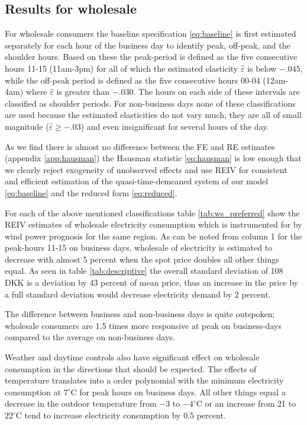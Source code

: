 \label{sec:results}
\subsection{Results for wholesale}
\label{subsec:r_wholesale}
For wholesale consumers the baseline specification \eqref{eq:baseline} is first estimated separately for each hour of the business day to identify peak, off-peak, and the shoulder hours. Based on these the peak-period is defined as the five consecutive hours 11-15 (11am-3pm) for all of which the estimated elasticity $\widehat{\varepsilon}$ is below $-.045$, while the off-peak period is defined as the five consecutive hours 00-04 (12am-4am) where $\widehat{\varepsilon}$ is greater than $-.030$. The hours on each side of these intervals are classified as shoulder periods. For non-business days none of these classifications are used because the estimated elasticities do not vary much, they are all of small magnitude ($\widehat{\varepsilon}\geq-.03$)  and even insignificant for several hours of the day.
\bigskip\par
As we find there is almost no difference between the FE and RE estimates (appendix \ref{app:hausman}) the Hausman statistic \eqref{eq:hausman} is low enough that we clearly reject exogeneity of unobserved effects and use REIV for consistent and efficient estimation of the quasi-time-demeaned system of our model \eqref{eq:baseline} and the reduced form \eqref{eq:reduced}.
\bigskip\par
For each of the above mentioned classifications table \ref{tab:ws_preferred} show the REIV estimates of wholesale electricity consumption which is instrumented for by wind power prognosis for the same region. As can be noted from column 1 for the peak-hours 11-15 on business days, wholesale of electricity is estimated to decrease with almost 5 percent when the spot price doubles all other things equal. As seen in table \ref{tab:descriptive} the overall standard deviation of 108 DKK is a deviation by 43 percent of mean price, thus an increase in the price by a full standard deviation would decrease electricity demand by 2 percent.
\par
The difference between business and non-business days is quite outspoken; wholesale consumers are 1.5 times more responsive at peak on business-days compared to the average on non-business days.
\par
Weather and daytime controls also have significant effect on wholesale consumption in the directions that should be expected. The effects of temperature translates into a  order polynomial with the minimum electricity consumption at $7^{\circ}$C for peak hours on business days. All other things equal a decrease in the outdoor temperature from $-3$ to $-4^{\circ}$C or an increase from 21 to $22^{\circ}$C tend to increase electricity consumption by 0.5 percent.
